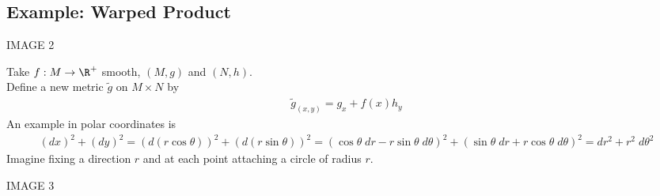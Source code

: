 \documentclass[11pt]{article}
\begin{document}
\subsection*{Example: Warped Product}
\label{sec:org0d2f2b5}
\begin{center}
IMAGE 2\\
\end{center}
Take \(f:M\to\R^{+}\) smooth, \((M,g)\) and \((N,h)\).\\
Define a new metric \(\tilde{g}\) on \(M\times N\) by\\
\begin{align*}
  \tilde{g}_{(x,y)}
  =g_{x}+f(x)h_{y}
\end{align*}
An example in polar coordinates is\\
\begin{align*}
  (dx)^{2}+(dy)^{2}
  =(d(r\cos\theta))^{2}+(d(r\sin\theta))^{2}
  =(\cos\theta\;dr-r\sin\theta\;d\theta)^{2}+(\sin\theta\;dr+r\cos\theta\;d\theta)^{2}
  =dr^{2}+r^{2}\;d\theta^{2}
\end{align*}
Imagine fixing a direction \(r\) and at each point attaching a circle of radius \(r\).\\
\begin{center}
IMAGE 3\\
\end{center}
\end{document}

